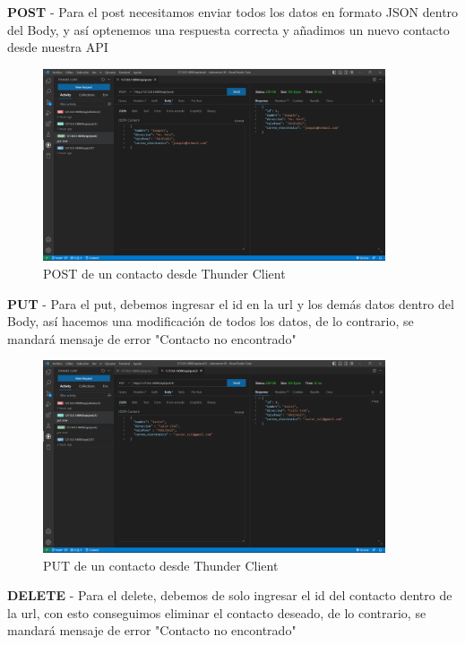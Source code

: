 \documentclass{article}
\begin{document}
    \textbf{POST} - 
    Para el post necesitamos enviar todos los datos en formato JSON dentro del Body, y así optenemos una respuesta correcta y añadimos un nuevo contacto desde nuestra API

        \begin{figure}[H]
            \centering
            \includegraphics[width=0.9\textwidth,keepaspectratio]{img/DjangoApiRest/post.png}
            \caption{POST de un contacto desde Thunder Client}
            \label{fig:enter-label}
        \end{figure}

    \textbf{PUT} - 
    Para el put, debemos ingresar el id en la url y los demás datos dentro del Body, así hacemos una modificación de todos los datos, de lo contrario, se mandará mensaje de error "Contacto no encontrado"

        \begin{figure}[H]
            \centering
            \includegraphics[width=0.9\textwidth,keepaspectratio]{img/DjangoApiRest/put.png}
            \caption{PUT de un contacto desde Thunder Client}
            \label{fig:enter-label}
        \end{figure}
        
    \textbf{DELETE} - 
    Para el delete, debemos de solo ingresar el id del contacto dentro de la url, con esto conseguimos eliminar el contacto deseado, de lo contrario, se mandará mensaje de error "Contacto no encontrado"
\end{document}
